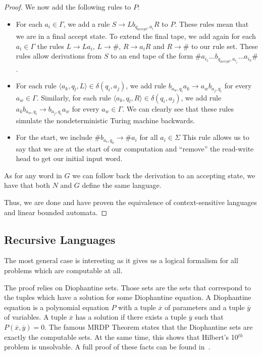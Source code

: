 \begin{proof}
    We now add the following rules to $P$:
    \begin{itemize}
        \setlength\itemsep{0.2em}
        \item For each $a_i \in \Gamma$, we add a rule $S \to Lb_{q_{accept}, a_i}R$ to $P$.
        These rules mean that we are in a final accept state.
        To extend the final tape, we add again for each $a_i \in \Gamma$ the rules $L \to La_i$, $L \to \#$, $R \to a_{i}R$ and $R \to \#$ to our rule set.
        These rules allow derivations from $S$ to an end tape of the form $\#a_{i_1}\dots b_{q_{accept}, a_{i_j}}\dots a_{i_k}\#$.
        \item For each rule $\langle a_k, q_l, L \rangle \in \delta(q_i, a_j)$, we add rule $b_{a_w, q_l}a_k \to a_{w}b_{a_j, q_i}$ for every $a_w \in \Gamma$.
        Similarly, for each rule $\langle a_k, q_l, R \rangle \in \delta(q_i, a_j)$, we add rule $a_{k}b_{a_w, q_l} \to b_{a_j, q_i}a_{w}$ for every $a_w \in \Gamma$.
        We can clearly see that these rules simulate the nondeterministic Turing machine backwards.
        \item For the start, we include $\#b_{a_i, q_0} \to \#a_i$ for all $a_i \in \Sigma$
        This rule allows us to say that we are at the start of our computation and ``remove'' the read-write head to get our initial input word.
    \end{itemize}
    As for any word in $G$ we can follow back the derivation to an accepting state, we have that both $N$ and $G$ define the same language.

    Thus, we are done and have proven the equivalence of context-sensitive languages and linear bounded automata.
\end{proof}


\subsection{Recursive Languages}\label{subsec:des-recursive-languages}

The most general case is interesting as it gives us a logical formalism for all problems which are computable at all.

The proof relies on Diophantine sets.
Those sets are the sets that correspond to the tuples which have a solution for some Diophantine equation.
A Diophantine equation is a polynomial equation $P$ with a tuple $\overline{x}$ of parameters and a tuple $\overline{y}$ of variables.
A tuple $\overline{x}$ has a solution if there exists a tuple $\overline{y}$ such that $P(\overline{x}, \overline{y}) = 0$.
The famous MRDP Theorem states that the Diophantine sets are exactly the computable sets.
At the same time, this shows that Hilbert's 10$^{th}$ problem is unsolvable.
A full proof of these facts can be found in~\cite{Matijasevic1996}.

